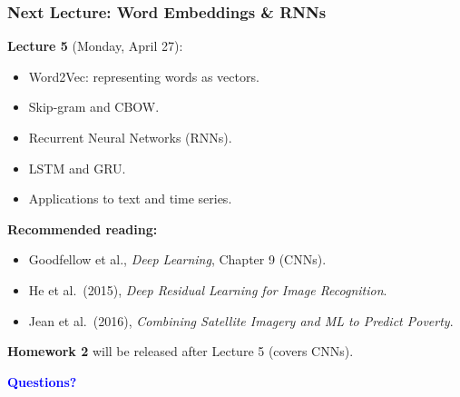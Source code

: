 \documentclass[notes,11pt, aspectratio=169]{beamer}
\begin{document}
\begin{frame}
\frametitle{Next Lecture: Word Embeddings \& RNNs}

\textbf{Lecture 5} (Monday, April 27):
\begin{itemize}
    \item Word2Vec: representing words as vectors.
    \item Skip-gram and CBOW.
    \item Recurrent Neural Networks (RNNs).
    \item LSTM and GRU.
    \item Applications to text and time series.
\end{itemize}

\vspace{6pt}
\textbf{Recommended reading:}
\begin{itemize}
    \item Goodfellow et al., \textit{Deep Learning}, Chapter 9 (CNNs).
    \item He et al.\ (2015), \textit{Deep Residual Learning for Image Recognition}.
    \item Jean et al.\ (2016), \textit{Combining Satellite Imagery and ML to Predict Poverty}.
\end{itemize}

\vspace{6pt}
\textbf{Homework 2} will be released after Lecture 5 (covers CNNs).

\vspace{4pt}
\begin{center}
\Large \textcolor{blue}{\textbf{Questions?}}
\end{center}
\end{frame}
\end{document}
